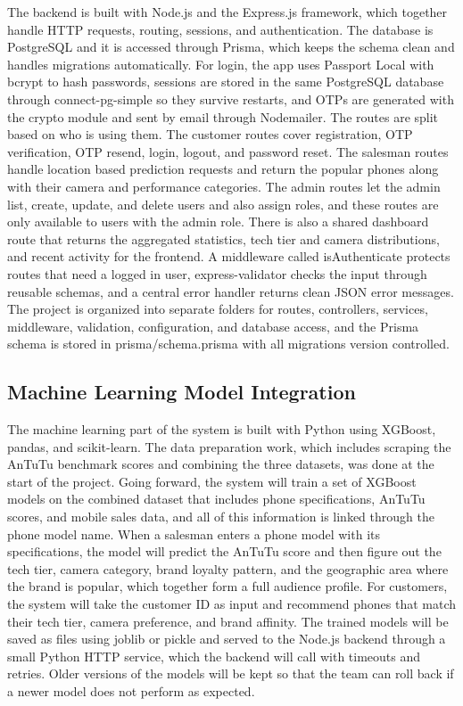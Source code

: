\documentclass[12pt, a4paper]{report}
\numberwithin{equation}{chapter}
\begin{document}
The backend is built with Node.js and the Express.js framework, which together handle HTTP requests, routing, sessions, and authentication. The database is PostgreSQL and it is accessed through Prisma, which keeps the schema clean and handles migrations automatically. For login, the app uses Passport Local with bcrypt to hash passwords, sessions are stored in the same PostgreSQL database through connect-pg-simple so they survive restarts, and OTPs are generated with the crypto module and sent by email through Nodemailer. The routes are split based on who is using them. The customer routes cover registration, OTP verification, OTP resend, login, logout, and password reset. The salesman routes handle location based prediction requests and return the popular phones along with their camera and performance categories. The admin routes let the admin list, create, update, and delete users and also assign roles, and these routes are only available to users with the admin role. There is also a shared dashboard route that returns the aggregated statistics, tech tier and camera distributions, and recent activity for the frontend. A middleware called isAuthenticate protects routes that need a logged in user, express-validator checks the input through reusable schemas, and a central error handler returns clean JSON error messages. The project is organized into separate folders for routes, controllers, services, middleware, validation, configuration, and database access, and the Prisma schema is stored in prisma/schema.prisma with all migrations version controlled.

\subsection{Machine Learning Model Integration}

The machine learning part of the system is built with Python using XGBoost, pandas, and scikit-learn. The data preparation work, which includes scraping the AnTuTu benchmark scores and combining the three datasets, was done at the start of the project. Going forward, the system will train a set of XGBoost models on the combined dataset that includes phone specifications, AnTuTu scores, and mobile sales data, and all of this information is linked through the phone model name. When a salesman enters a phone model with its specifications, the model will predict the AnTuTu score and then figure out the tech tier, camera category, brand loyalty pattern, and the geographic area where the brand is popular, which together form a full audience profile. For customers, the system will take the customer ID as input and recommend phones that match their tech tier, camera preference, and brand affinity. The trained models will be saved as files using joblib or pickle and served to the Node.js backend through a small Python HTTP service, which the backend will call with timeouts and retries. Older versions of the models will be kept so that the team can roll back if a newer model does not perform as expected.
\end{document}
